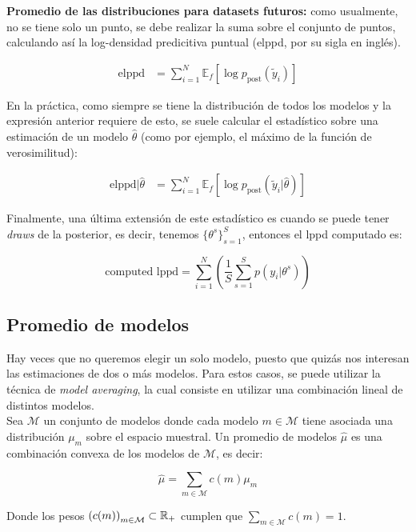 \textbf{Promedio de las distribuciones para datasets futuros:} como usualmente, no se tiene solo un punto, se debe realizar la suma sobre el conjunto de puntos, calculando así la log-densidad predicitiva puntual (elppd, por su sigla en inglés).

\begin{align}
\text{elppd} & = \sum_{i=1}^N \mathbb{E}_f[\log p_{\text{post}}(\tilde{y}_i)]
\end{align}

En la práctica, como siempre se tiene la distribución de todos los modelos y la expresión anterior requiere de esto, se suele calcular el estadístico sobre una estimación de un modelo $\hat{\theta}$ (como por ejemplo, el máximo de la función de verosimilitud):

\begin{align}
\text{elppd}|\hat{\theta} & = \sum_{i=1}^N \mathbb{E}_f[\log p_{\text{post}}(\tilde{y}_i|\hat{\theta})]
\end{align}

Finalmente, una última extensión de este estadístico es cuando se puede tener \emph{draws} de la posterior, es decir, tenemos $\{ \theta^s\}_{s=1}^S$, entonces el lppd computado es:

\begin{equation}
\text{computed lppd} = \sum_{i=1}^N \left( \frac{1}{S} \sum_{s=1}^S p(y_i|\theta^s)\right)
\end{equation}


\subsection{Promedio de modelos}
Hay veces que no queremos elegir un solo modelo, puesto que quizás nos interesan las estimaciones de dos o más modelos. Para estos casos, se puede utilizar la técnica de \emph{model averaging}, la cual consiste en utilizar una combinación lineal de distintos modelos.\\

Sea $\mathcal{M}$ un conjunto de modelos donde cada modelo $m\in\mathcal{M}$ tiene asociada una distribución $\mu_m$ sobre el espacio muestral. Un promedio de modelos $\hat{\mu}$ es una combinación convexa de los modelos de $\mathcal{M}$, es decir:

\begin{equation}
\hat{\mu} = \sum_{m\in \mathcal{M}} c(m) \mu_m
\end{equation}

Donde los pesos $\left(c(m)\right)_{m\in\mathcal{M}}\subset\mathbb{R}_+$ cumplen que $\sum_{m\in \mathcal{M}} c(m) = 1$.\\

